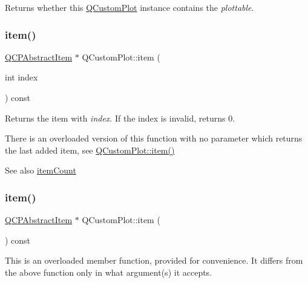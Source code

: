 Returns whether this \mbox{\hyperlink{class_q_custom_plot}{Q\+Custom\+Plot}} instance contains the {\itshape plottable}. \mbox{\label{class_q_custom_plot_ac042f2e78edd228ccf2f26b7fe215239}} 
\subsubsection{\texorpdfstring{item()}{item()}\hspace{0.1cm}{\footnotesize\ttfamily [1/2]}}
{\footnotesize\ttfamily \mbox{\hyperlink{class_q_c_p_abstract_item}{Q\+C\+P\+Abstract\+Item}} $\ast$ Q\+Custom\+Plot\+::item (\begin{DoxyParamCaption}\item[{int}]{index }\end{DoxyParamCaption}) const}

Returns the item with {\itshape index}. If the index is invalid, returns 0.

There is an overloaded version of this function with no parameter which returns the last added item, see \mbox{\hyperlink{class_q_custom_plot_ac042f2e78edd228ccf2f26b7fe215239}{Q\+Custom\+Plot\+::item()}}

\begin{DoxySeeAlso}{See also}
\mbox{\hyperlink{class_q_custom_plot_a16025daf0341f9362be3080e404424c2}{item\+Count}} 
\end{DoxySeeAlso}
\mbox{\label{class_q_custom_plot_a12eb2a283cf10a8a9176c01c0443e83e}} 
\subsubsection{\texorpdfstring{item()}{item()}\hspace{0.1cm}{\footnotesize\ttfamily [2/2]}}
{\footnotesize\ttfamily \mbox{\hyperlink{class_q_c_p_abstract_item}{Q\+C\+P\+Abstract\+Item}} $\ast$ Q\+Custom\+Plot\+::item (\begin{DoxyParamCaption}{ }\end{DoxyParamCaption}) const}

This is an overloaded member function, provided for convenience. It differs from the above function only in what argument(s) it accepts.

